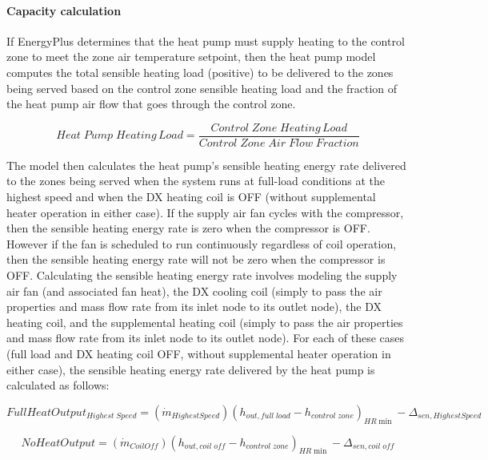 \paragraph{Capacity calculation}\label{capacity-calculation-1}

If EnergyPlus determines that the heat pump must supply heating to the control zone to meet the zone air temperature setpoint, then the heat pump model computes the total sensible heating load (positive) to be delivered to the zones being served based on the control zone sensible heating load and the fraction of the heat pump air flow that goes through the control zone.

\begin{equation}
Heat\;Pump\;Heating\,Load = \frac{{Control\;Zone\;Heating\,Load}}{{Control\;Zone\;Air\;Flow\;Fraction}}
\end{equation}

The model then calculates the heat pump's sensible heating energy rate delivered to the zones being served when the system runs at full-load conditions at the highest speed and when the DX heating coil is OFF (without supplemental heater operation in either case). If the supply air fan cycles with the compressor, then the sensible heating energy rate is zero when the compressor is OFF. However if the fan is scheduled to run continuously regardless of coil operation, then the sensible heating energy rate will not be zero when the compressor is OFF. Calculating the sensible heating energy rate involves modeling the supply air fan (and associated fan heat), the DX cooling coil (simply to pass the air properties and mass flow rate from its inlet node to its outlet node), the DX heating coil, and the supplemental heating coil (simply to pass the air properties and mass flow rate from its inlet node to its outlet node). For each of these cases (full load and DX heating coil OFF, without supplemental heater operation in either case), the sensible heating energy rate delivered by the heat pump is calculated as follows:

\begin{equation}
FullHeatOutpu{t_{Highest\;Speed}} = \left( {{{\dot m}_{HighestSpeed}}} \right){\left( {{h_{out,full\;load}} - {h_{control\;zone}}} \right)_{HR\min }} - {\Delta_{sen,HighestSpeed}}
\end{equation}

\begin{equation}
NoHeatOutput = \left( {{{\dot m}_{CoilOff}}} \right){\left( {{h_{out,coil\;off}} - {h_{control\;zone}}} \right)_{HR\min }} - {\Delta_{sen,coil\;off}}
\end{equation}

